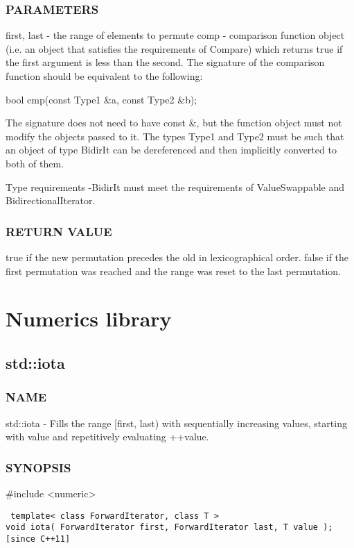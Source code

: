 \subsubsection{PARAMETERS}
first, last - the range of elements to permute
comp - comparison function object (i.e. an object that satisfies the requirements of Compare) which returns true if the first argument is less than the second.
The signature of the comparison function should be equivalent to the following:

 bool cmp(const Type1 \&a, const Type2 \&b);

The signature does not need to have const \&, but the function object must not modify the objects passed to it.
The types Type1 and Type2 must be such that an object of type BidirIt can be dereferenced and then implicitly converted to both of them.

 Type requirements
 -BidirIt must meet the requirements of ValueSwappable and BidirectionalIterator.

\subsubsection{RETURN VALUE}
true if the new permutation precedes the old in lexicographical order. false if the first permutation was reached and the range was reset to the last permutation.



\section{Numerics library}

\subsection{std::iota}

\subsubsection{NAME}
std::iota - Fills the range [first, last) with sequentially increasing values, starting with value and repetitively evaluating ++value.

\subsubsection{SYNOPSIS}
\#include <numeric>

\begin{lstlisting}
 template< class ForwardIterator, class T >
void iota( ForwardIterator first, ForwardIterator last, T value ); [since C++11]
\end{lstlisting}

